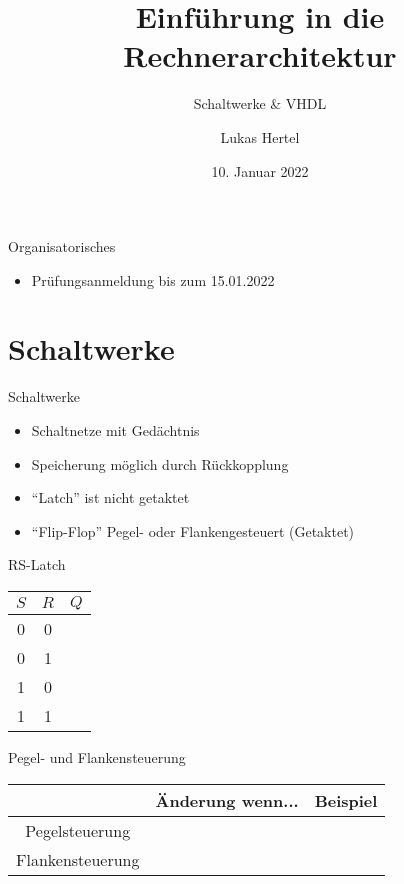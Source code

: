 \documentclass[
  german,            %
  aspectratio=169,    %
  sectionpage=false,   %
]{tumbeamer}
\title{Einführung in die Rechnerarchitektur}
\subtitle{Schaltwerke \& VHDL}
\author{Lukas Hertel}
\institute{\theChairName\\\theDepartmentName\\\theUniversityName}
\date[10.01.2022]{10. Januar 2022}
\begin{document}
\maketitle
\begin{frame}{Organisatorisches}
	\begin{itemize}
		\item Prüfungsanmeldung bis zum 15.01.2022
	\end{itemize}
\end{frame}

\section{Schaltwerke}
\begin{frame}{Schaltwerke}
	\begin{itemize}
		\item Schaltnetze mit Gedächtnis
		\item Speicherung möglich durch Rückkopplung
		\item ``Latch'' ist nicht getaktet
		\item ``Flip-Flop'' Pegel- oder Flankengesteuert (Getaktet)
	\end{itemize}
\end{frame}
\begin{frame}{RS-Latch}
\centering
\begin{tabular}[t]{cc|c}
	\(S\)    & \(R\) & \(Q\) \\
	\hline
	0         & 0     &  \\
	0        & 1     & \\
	1        & 0     & \\
	1         & 1     &  \\
\end{tabular}
\end{frame}

\begin{frame}{Pegel- und Flankensteuerung}
	\centering
	\renewcommand{\arraystretch}{2.5}
	\setlength{\tabcolsep}{20pt}
	\begin{tabular}{|c|c|c|}
		\hline
		& Änderung wenn... & Beispiel \\
		\hline
		Pegelsteuerung &  &  \\
		\hline
		Flankensteuerung &  &  \\
		\hline
	\end{tabular}
\end{frame}
\end{document}
